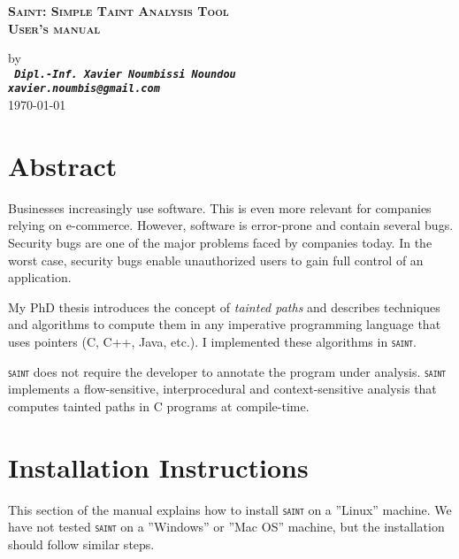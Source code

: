 \documentclass[12pt,onecolumn,a4paper]{article}
\newcommand{\saint}{\texttt{\textsc{saint}}\xspace}
\begin{document}
\pagestyle{empty}

\author{Xavier NOUMBISSI NOUNDOU}

\begin{center}
\begin{LARGE}
\textbf{ \textsc{Saint: Simple Taint Analysis Tool\\
				User's manual}}\\
\end{LARGE}
\begin{large}
\vspace{0.3cm}
by\\
\vspace{0.3cm}
\texttt{ \bf \textit{Dipl.-Inf. Xavier Noumbissi Noundou\\
xavier.noumbis@gmail.com}}\\
\vspace{0.3cm}
\today{}\\
\vspace{1.3cm}
\end{large}
\end{center}

\tableofcontents

\section{Abstract}
Businesses increasingly use software. This is even more
relevant for companies relying on e-commerce. However,
software is error-prone and contain several bugs. Security
bugs are one of the major problems faced by companies today.
In the worst case, security bugs enable unauthorized users
to gain full control of an application.

My PhD thesis introduces the concept of 
\textcolor{firebrickred}{\textit{tainted paths}} and
describes techniques and algorithms to compute them in
any imperative programming language that uses
pointers (C, C++, Java, etc.). I implemented these
algorithms in \saint.

\saint does not require the developer to annotate
the program under analysis. \saint implements a
flow-sensitive, interprocedural and context-sensitive
analysis that computes tainted paths in C programs
at compile-time.

\section{Installation Instructions}
This section of the manual explains how to install \saint
on a ''Linux'' machine. We have not tested \saint on a ''Windows''
or ''Mac OS'' machine, but the installation should follow similar steps. 
\end{document}
